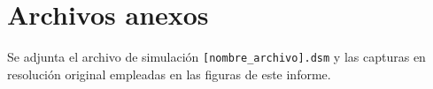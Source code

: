 \documentclass[conference,a4paper,10pt]{IEEEtran}
\begin{document}
\section{Archivos anexos}
Se adjunta el archivo de simulación \texttt{[nombre\_archivo].dsm} y las
capturas en resolución original empleadas en las figuras de este informe.



\end{document}
